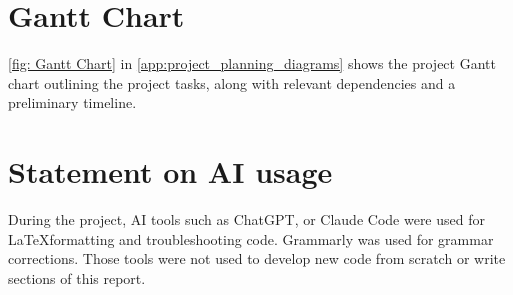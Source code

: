 

\section{Gantt Chart}
\label{sec:planning_gantt_chart}

\autoref{fig: Gantt Chart} in \autoref{app:project_planning_diagrams} shows the project Gantt chart outlining the project tasks, along with relevant dependencies and a preliminary timeline.

\section{Statement on AI usage}

During the project, AI tools such as ChatGPT, or Claude Code were used for \LaTeX formatting and troubleshooting code. Grammarly was used for grammar corrections. Those tools were not used to develop new code from scratch or write sections of this report.